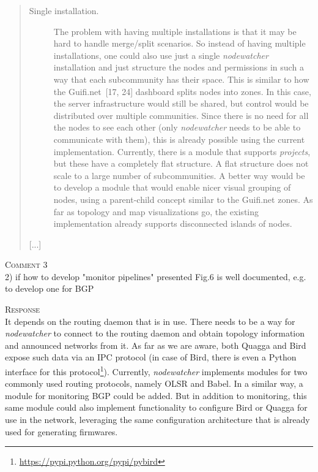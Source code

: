 \documentclass[12pt,twoside,a4paper]{report}
\newcommand{\nodewatcher}{\textit{nodewatcher}}
\begin{document}
\begin{quote}
\begin{description}
    \item[Single installation.] The problem with having multiple installations is that it may be hard to handle merge/split scenarios.
    So instead of having multiple installations, one could also use just a single \nodewatcher{} installation and just structure the nodes and permissions in such a way that each subcommunity has their space.
    This is similar to how the Guifi.net~[17, 24] dashboard splits nodes into zones.
    In this case, the server infrastructure would still be shared, but control would be distributed over multiple communities.
    Since there is no need for all the nodes to see each other (only \nodewatcher{} needs to be able to communicate with them), this is already possible using the current implementation.
    Currently, there is a module that supports \textit{projects}, but these have a completely flat structure.
    A flat structure does not scale to a large number of subcommunities.
    A better way would be to develop a module that would enable nicer visual grouping of nodes, using a parent-child concept similar to the Guifi.net zones.
    As far as topology and map visualizations go, the existing implementation already supports disconnected islands of nodes.
\end{description}

[...]

\end{quote}

\vspace{0.5cm}\noindent\textsc{Comment 3}\\
  2) if how to develop "monitor pipelines" presented Fig.6 is well documented, e.g. to develop one for BGP
  
\vspace{0.5cm}\noindent\textsc{Response}\\
It depends on the routing daemon that is in use.
There needs to be a way for \nodewatcher{} to connect to the routing daemon and obtain topology information and announced networks from it.
As far as we are aware, both Quagga and Bird expose such data via an IPC protocol (in case of Bird, there is even a Python interface for this protocol\footnote{\url{https://pypi.python.org/pypi/pybird}}).
Currently, \nodewatcher{} implements modules for two commonly used routing protocols, namely OLSR and Babel.
In a similar way, a module for monitoring BGP could be added.
But in addition to monitoring, this same module could also implement functionality to configure Bird or Quagga for use in the network, leveraging the same configuration architecture that is already used for generating firmwares.
\end{document}
